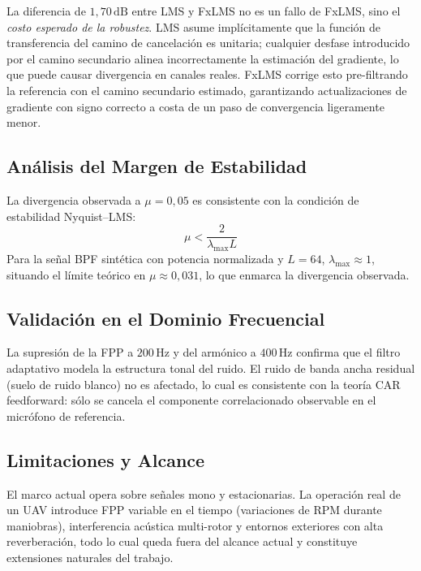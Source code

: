 \documentclass[journal,12pt,onecolumn]{IEEEtran}
\newcommand{\SI}[2]{\ensuremath{#1\,\mathrm{#2}}}
\begin{document}
La diferencia de \SI{1,70}{dB} entre LMS y FxLMS no es un fallo de
FxLMS, sino el \emph{costo esperado de la robustez}.
LMS asume implícitamente que la función de transferencia del camino de
cancelación es unitaria; cualquier desfase introducido por el camino
secundario alinea incorrectamente la estimación del gradiente, lo que
puede causar divergencia en canales reales.
FxLMS corrige esto pre-filtrando la referencia con el camino secundario
estimado, garantizando actualizaciones de gradiente con signo correcto
a costa de un paso de convergencia ligeramente menor.

\subsection{Análisis del Margen de Estabilidad}

La divergencia observada a $\mu=0{,}05$ es consistente con la condición
de estabilidad Nyquist--LMS:
\begin{equation}
  \mu < \frac{2}{\lambda_{\max} L}
\end{equation}
Para la señal BPF sintética con potencia normalizada y $L=64$,
$\lambda_{\max}\approx 1$, situando el límite teórico en
$\mu\approx 0{,}031$, lo que enmarca la divergencia observada.

\subsection{Validación en el Dominio Frecuencial}

La supresión de la FPP a \SI{200}{Hz} y del armónico a \SI{400}{Hz}
confirma que el filtro adaptativo modela la estructura tonal del ruido.
El ruido de banda ancha residual (suelo de ruido blanco) no es afectado,
lo cual es consistente con la teoría CAR feedforward: sólo se cancela
el componente correlacionado observable en el micrófono de referencia.

\subsection{Limitaciones y Alcance}

El marco actual opera sobre señales mono y estacionarias.
La operación real de un UAV introduce FPP variable en el tiempo
(variaciones de RPM durante maniobras), interferencia acústica
multi-rotor y entornos exteriores con alta reverberación, todo lo cual
queda fuera del alcance actual y constituye extensiones naturales del trabajo.

\end{document}
